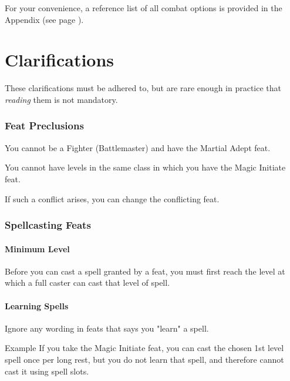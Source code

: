 \documentclass[letterpaper,twocolumn,openany,nodeprecatedcode,bg=print]{dndbook}
\newcommand{\pg}[1]{page \pageref{#1}}
\newcommand{\see}[1]{(see \pg{#1})}
\begin{document}
For your convenience, a reference list of all combat options is provided in the Appendix \see{combat-options}.















\chapter{Clarifications}

\noindent These clarifications must be adhered to, but are rare enough in practice that \textit{reading} them is not mandatory.

\subsection{Feat Preclusions}
You cannot be a Fighter (Battlemaster) and have the Martial Adept feat.

You cannot have levels in the same class in which you have the Magic Initiate feat.

If such a conflict arises, you can change the conflicting feat.

\subsection{Spellcasting Feats}

\subsubsection{Minimum Level}
Before you can cast a spell granted by a feat, 
you must first reach the level at which a full caster can cast that level of spell.

\subsubsection{Learning Spells}
Ignore any wording in feats that says you "learn" a spell.

\begin{DndComment}{Example}
If you take the Magic Initiate feat, 
you can cast the chosen 1st level spell once per long rest, 
but you do not learn that spell, and therefore cannot cast it using spell slots.
\end{DndComment}
\end{document}
